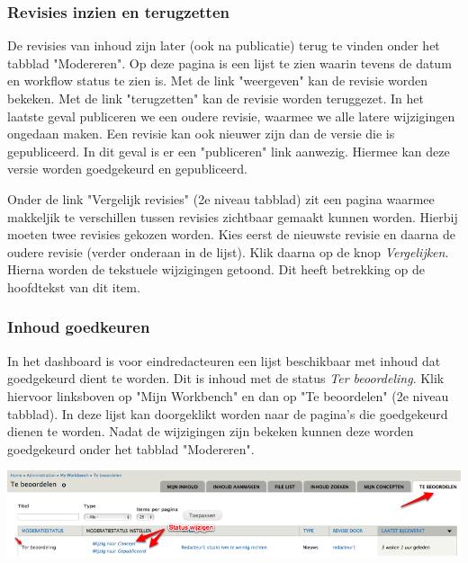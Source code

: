 \subsubsection{Revisies inzien en terugzetten}\label{modererentab}

De revisies van inhoud zijn later (ook na publicatie) terug te vinden onder het tabblad "Modereren". Op deze pagina is een lijst te zien waarin tevens de datum en workflow status te zien is. Met de link "weergeven" kan de revisie worden bekeken. Met de link "terugzetten" kan de revisie worden teruggezet. In het laatste geval publiceren we een oudere revisie, waarmee we alle latere wijzigingen ongedaan maken. Een revisie kan ook nieuwer zijn dan de versie die is gepubliceerd. In dit geval is er een "publiceren" link aanwezig. Hiermee kan deze versie worden goedgekeurd en gepubliceerd.

Onder de link "Vergelijk revisies" (2e niveau tabblad) zit een pagina waarmee makkeljik te verschillen tussen revisies zichtbaar gemaakt kunnen worden. Hierbij moeten twee revisies gekozen worden. Kies eerst de nieuwste revisie en daarna de oudere revisie (verder onderaan in de lijst). Klik daarna op de knop \emph{Vergelijken}. Hierna worden de tekstuele wijzigingen getoond. Dit heeft betrekking op de hoofdtekst van dit item.

\subsubsection{Inhoud goedkeuren}\label{inhoudgoedkeuren}

In het dashboard is voor eindredacteuren een lijst beschikbaar met inhoud dat goedgekeurd dient te worden. Dit is inhoud met de status \emph{Ter beoordeling}. Klik hiervoor linksboven op "Mijn Workbench" en dan op "Te beoordelen" (2e niveau tabblad). In deze lijst kan doorgeklikt worden naar de pagina's die goedgekeurd dienen te worden. Nadat de wijzigingen zijn bekeken kunnen deze worden goedgekeurd onder het tabblad "Modereren".

\begin{center}
\includegraphics[width=\textwidth]{img/publiceren.png}
\end{center}